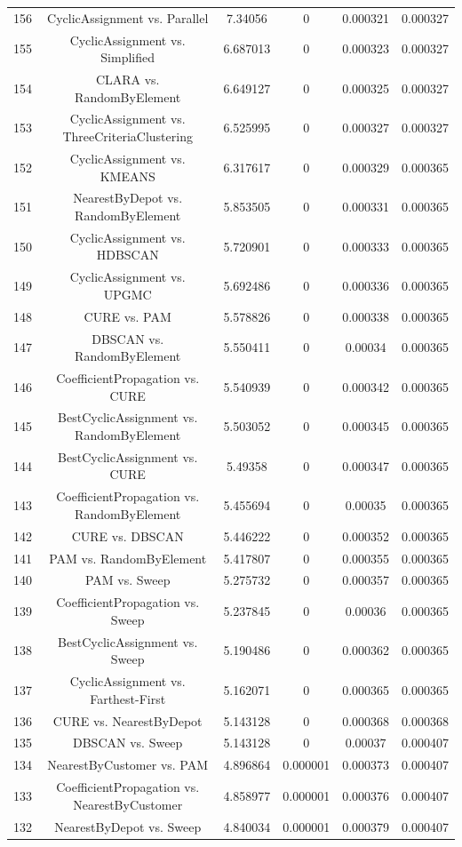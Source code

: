 \documentclass[a4paper,10pt]{article}
\begin{document}
\begin{landscape}
\begin{table}[!htp]
\begin{tabular}{cccccc}
156&CyclicAssignment vs. Parallel&7.34056&0&0.000321&0.000327\\
155&CyclicAssignment vs. Simplified&6.687013&0&0.000323&0.000327\\
154&CLARA vs. RandomByElement&6.649127&0&0.000325&0.000327\\
153&CyclicAssignment vs. ThreeCriteriaClustering&6.525995&0&0.000327&0.000327\\
152&CyclicAssignment vs. KMEANS&6.317617&0&0.000329&0.000365\\
151&NearestByDepot vs. RandomByElement&5.853505&0&0.000331&0.000365\\
150&CyclicAssignment vs. HDBSCAN&5.720901&0&0.000333&0.000365\\
149&CyclicAssignment vs. UPGMC&5.692486&0&0.000336&0.000365\\
148&CURE vs. PAM&5.578826&0&0.000338&0.000365\\
147&DBSCAN vs. RandomByElement&5.550411&0&0.00034&0.000365\\
146&CoefficientPropagation vs. CURE&5.540939&0&0.000342&0.000365\\
145&BestCyclicAssignment vs. RandomByElement&5.503052&0&0.000345&0.000365\\
144&BestCyclicAssignment vs. CURE&5.49358&0&0.000347&0.000365\\
143&CoefficientPropagation vs. RandomByElement&5.455694&0&0.00035&0.000365\\
142&CURE vs. DBSCAN&5.446222&0&0.000352&0.000365\\
141&PAM vs. RandomByElement&5.417807&0&0.000355&0.000365\\
140&PAM vs. Sweep&5.275732&0&0.000357&0.000365\\
139&CoefficientPropagation vs. Sweep&5.237845&0&0.00036&0.000365\\
138&BestCyclicAssignment vs. Sweep&5.190486&0&0.000362&0.000365\\
137&CyclicAssignment vs. Farthest-First&5.162071&0&0.000365&0.000365\\
136&CURE vs. NearestByDepot&5.143128&0&0.000368&0.000368\\
135&DBSCAN vs. Sweep&5.143128&0&0.00037&0.000407\\
134&NearestByCustomer vs. PAM&4.896864&0.000001&0.000373&0.000407\\
133&CoefficientPropagation vs. NearestByCustomer&4.858977&0.000001&0.000376&0.000407\\
132&NearestByDepot vs. Sweep&4.840034&0.000001&0.000379&0.000407\\

\end{tabular}
\end{table}
\end{landscape}
\end{document}
